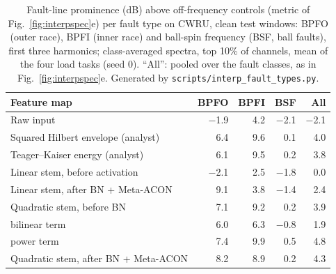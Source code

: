 \begin{table}[h]
\caption{Fault-line prominence (dB) above off-frequency controls (metric of Fig.~\ref{fig:interpspec}e) per fault type on CWRU, clean test windows: BPFO (outer race), BPFI (inner race) and ball-spin frequency (BSF, ball faults), first three harmonics; class-averaged spectra, top 10\% of channels, mean of the four load tasks (seed 0). ``All'': pooled over the fault classes, as in Fig.~\ref{fig:interpspec}e. Generated by \texttt{scripts/interp\_fault\_types.py}.}\label{tab:faulttypes}
\centering\small
\begin{tabular}{lrrrr}
\toprule
Feature map & BPFO & BPFI & BSF & All \\
\midrule
Raw input & $-$1.9 & 4.2 & $-$2.1 & $-$2.1 \\
Squared Hilbert envelope (analyst) & 6.4 & 9.6 & 0.1 & 4.0 \\
Teager--Kaiser energy (analyst) & 6.1 & 9.5 & 0.2 & 3.8 \\
Linear stem, before activation & $-$2.1 & 2.5 & $-$1.8 & 0.0 \\
Linear stem, after BN + Meta-ACON & 9.1 & 3.8 & $-$1.4 & 2.4 \\
Quadratic stem, before BN & 7.1 & 9.2 & 0.2 & 3.9 \\
\quad bilinear term & 6.0 & 6.3 & $-$0.8 & 1.9 \\
\quad power term & 7.4 & 9.9 & 0.5 & 4.8 \\
Quadratic stem, after BN + Meta-ACON & 8.2 & 8.9 & 0.2 & 4.3 \\
\bottomrule
\end{tabular}
\end{table}
